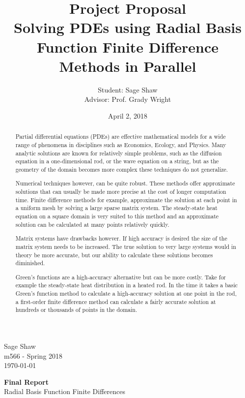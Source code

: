 \documentclass[12pt]{article}
\title{Project Proposal\\ \large Solving PDEs using Radial Basis Function Finite Difference Methods in Parallel}
\author{Student: Sage Shaw\\ Advisor: Prof. Grady Wright}
\date{April 2, 2018}
\begin{document}
	\thispagestyle{empty}
	
	\begin{flushright}
		Sage Shaw \\
		m566 - Spring 2018 \\
		\today
	\end{flushright}
	
	\begin{center}
		\Huge \textbf{Final Report} \\
		\large Radial Basis Function Finite Differences
	\end{center}

\begin{abstract}

	Partial differential equations (PDEs) are effective mathematical models for a wide range of phenomena in disciplines such as Economics, Ecology, and Physics. Many analytic solutions are known for relatively simple problems, such as the diffusion equation in a one-dimensional rod, or the wave equation on a string, but as the geometry of the domain becomes more complex these techniques do not generalize. 
	
	Numerical techniques however, can be quite robust. These methods offer approximate solutions that can usually be made more precise at the cost of longer computation time. Finite difference methods for example, approximate the solution at each point in a uniform mesh by solving a large sparse matrix system. The steady-state heat equation on a square domain is very suited to this method and an approximate solution can be calculated at many points relatively quickly. 
	
	Matrix systems have drawbacks however. If high accuracy is desired the size of the matrix system needs to be increased. The true solution to very large systems would in theory be more accurate, but our ability to calculate these solutions becomes diminished.
	
	Green's functions are a high-accuracy alternative but can be more costly. Take for example the steady-state heat distribution in a heated rod. In the time it takes a basic Green's function method to calculate a high-accuracy solution at one point in the rod, a first-order finite difference method can calculate a fairly accurate solution at hundreds or thousands of points in the domain. 
	

\end{abstract}
\end{document}
